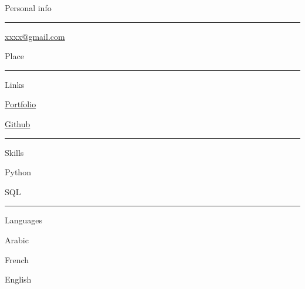 \documentclass{letter}
\begin{document}
\begin{minipage}[t]{0.40\textwidth}
\setlength{\baselineskip}{1.5\baselineskip}
\color{white}
\vspace{1cm}
{\large Personal info}

\rule{\linewidth}{0.4pt}

\faPhone {}


\faEnvelope \quad \href{somelink.com}{xxxx@gmail.com}


\faMapMarker \quad Place

\rule{\linewidth}{0.4pt}

{\large Links}

\faCode \quad \href{google.com}{Portfolio}

\faGithub \quad \href{github.com}{Github}

\rule{\linewidth}{0.4pt}

{\large Skills}

\faCircleNotch \quad Python

\faCircleNotch \quad SQL


\rule{\linewidth}{0.4pt}

{\large Languages}

\faLanguage \quad Arabic

\faLanguage \quad French

\faLanguage \quad English

\end{minipage}
\hfill
\end{document}
